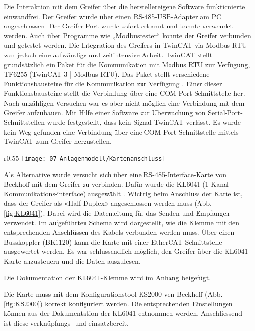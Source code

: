 		Die Interaktion mit dem Greifer über die herstellereigene Software funktionierte einwandfrei. Der Greifer wurde über einen RS-485-USB-Adapter am PC angeschlossen. Der Greifer-Port wurde sofort erkannt und konnte verwendet werden. Auch über Programme wie „Modbustester“ konnte der Greifer verbunden und getestet werden. Die Integration des Greifers in TwinCAT via Modbus RTU war jedoch eine aufwändige und zeitintensive Arbeit. TwinCAT stellt grundsätzlich ein Paket für die Kommunikation mit Modbus RTU zur Verfügung, TF6255 (TwinCAT 3 | Modbus RTU). Das Paket stellt verschiedene Funktionsbausteine für die Kommunikation zur Verfügung \cite{TF6255}. Einer dieser Funktionsbausteine stellt die Verbindung über eine COM-Port-Schnittstelle her. Nach unzähligen Versuchen war es aber nicht möglich eine Verbindung mit dem Greifer aufzubauen. Mit Hilfe einer Software zur Überwachung von Serial-Port-Schnittstellen wurde festgestellt, dass kein Signal TwinCAT verlässt. Es wurde kein Weg gefunden eine Verbindung über eine COM-Port-Schnittstelle mittels TwinCAT zum Greifer herzustellen.
		\\
		\vspace{-5mm} 
		\begin{wrapfigure}{r}{0.55\textwidth}
			\centering
			\texttt{[image: 07\_Anlagenmodell/Kartenanschluss]}
			\captionsetup{justification=centering}
			\caption{Anschluss der Beckhoff-Karte}
			\label{fig:KL6041}
		\end{wrapfigure}
		Als Alternative wurde versucht sich über eine RS-485-Interface-Karte von Beckhoff mit dem Greifer zu verbinden. Dafür wurde die KL6041 (1-Kanal-Kommunikations-interface) ausgewählt \cite{KL6041}. Wichtig beim Anschluss der Karte ist, dass der Greifer als «Half-Duplex» angeschlossen werden muss (Abb. \ref{fig:KL6041}). Dabei wird die Datenleitung für das Senden und Empfangen verwendet. Im aufgeführten Schema wird dargestellt, wie die Klemme mit den entsprechenden Anschlüssen des Kabels verbunden werden muss. Über einen Busskoppler (BK1120) kann die Karte mit einer EtherCAT-Schnittstelle ausgewertet werden. Es war schlussendlich möglich, den Greifer über die KL6041-Karte anzusteuern und die Daten auszulesen. 
		
		\begin{bfhNoteBox}
			Die Dokumentation der KL6041-Klemme wird im Anhang beigefügt. 
		\end{bfhNoteBox}
		
		\newpage
		
		Die Karte muss mit dem Konfigurationstool KS2000 von Beckhoff (Abb. \ref{fig:KS2000}) korrekt konfiguriert werden. Die entsprechenden Einstellungen können aus der Dokumentation der KL6041 entnommen werden.  Anschliessend  ist diese verknüpfungs- und einsatzbereit. 
		
